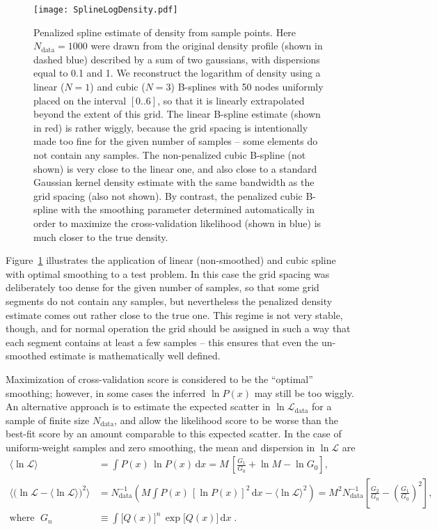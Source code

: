 \documentclass[12pt]{article}
\renewcommand{\d}{\mathrm{d}}
\begin{document}
\begin{figure}[t]
\begin{center}
\texttt{[image: SplineLogDensity.pdf]}
\end{center}
\caption{Penalized spline estimate of density from sample points. Here $N_\mathrm{data}=1000$ were drawn from the original density profile (shown in dashed blue) described by a sum of two gaussians, with dispersions equal to 0.1 and 1. We reconstruct the logarithm of density using a linear ($N=1$) and cubic ($N=3$) B-splines with 50 nodes uniformly placed on the interval $[0..6]$, so that it is linearly extrapolated beyond the extent of this grid. The linear B-spline estimate (shown in red) is rather wiggly, because the grid spacing is intentionally made too fine for the given number of samples -- some elements do not contain any samples. The non-penalized cubic B-spline (not shown) is very close to the linear one, and also close to a standard Gaussian kernel density estimate with the same bandwidth as the grid spacing (also not shown). By contrast, the penalized cubic B-spline with the smoothing parameter determined automatically in order to maximize the cross-validation likelihood (shown in blue) is much closer to the true density.
} \label{fig:SplineLogDensity}
\end{figure}

Figure~\ref{fig:SplineLogDensity} illustrates the application of linear (non-smoothed) and cubic spline with optimal smoothing to a test problem. In this case the grid spacing was deliberately too dense for the given number of samples, so that some grid segments do not contain any samples, but nevertheless the penalized density estimate comes out rather close to the true one.
This regime is not very stable, though, and for normal operation the grid should be assigned in such a way that each segment contains at least a few samples -- this ensures that even the un-smoothed estimate is mathematically well defined.

Maximization of cross-validation score is considered to be the ``optimal'' smoothing; however, in some cases the inferred $\ln P(x)$ may still be too wiggly. An alternative approach is to estimate the expected scatter in $\ln\mathcal{L}_\mathrm{data}$ for a sample of finite size $N_\mathrm{data}$, and allow the likelihood score to be worse than the best-fit score by an amount comparable to this expected scatter. In the case of uniform-weight samples and zero smoothing, the mean and dispersion in $\ln\mathcal{L}$ are
\begin{align}
\big\langle\ln\mathcal{L}\big\rangle &=
  \int P(x)\,\ln P(x)\, \d x = M\,\left[\frac{G_1}{G_0} + \ln M - \ln G_0\right] ,\\
\Big\langle\big(\ln\mathcal{L}-\langle\ln\mathcal{L}\rangle\big)^2\Big\rangle &=
  N_\mathrm{data}^{-1} \left( M\!\int\! P(x)\,[\ln P(x)]^2\, \d x - \big\langle\ln\mathcal{L}\big\rangle^2 \right) =
  M^2 N_\mathrm{data}^{-1} \left[\frac{G_2}{G_0} - \left(\frac{G_1}{G_0}\right)^{\!2}\right]\! , \nonumber\\
\mbox{where }\; G_n &\equiv \int \big[Q(x)\big]^n\, \exp\big[Q(x)\big]\,\d x\;.  \nonumber
\end{align}
\end{document}
